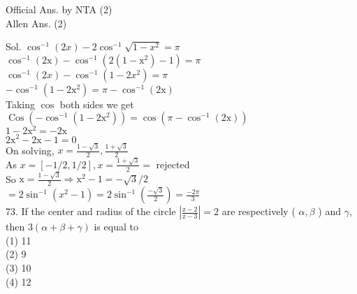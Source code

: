 \documentclass[10pt]{article}
\begin{document}
Official Ans. by NTA (2)\\
Allen Ans. (2)

Sol. \(\cos ^{-1}(2 x)-2 \cos ^{-1} \sqrt{1-x^{2}}=\pi\)\\
\(\cos ^{-1}(2 \mathrm{x})-\cos ^{-1}\left(2\left(1-\mathrm{x}^{2}\right)-1\right)=\pi\)\\
\(\cos ^{-1}(2 x)-\cos ^{-1}\left(1-2 x^{2}\right)=\pi\)\\
\(-\cos ^{-1}\left(1-2 \mathrm{x}^{2}\right)=\pi-\cos ^{-1}(2 \mathrm{x})\)\\
Taking \(\cos\) both sides we get\\
\(\operatorname{Cos}\left(-\cos ^{-1}\left(1-2 \mathrm{x}^{2}\right)\right)=\cos \left(\pi-\cos ^{-1}(2 \mathrm{x})\right)\)\\
\(1-2 \mathrm{x}^{2}=-2 \mathrm{x}\)\\
\(2 \mathrm{x}^{2}-2 \mathrm{x}-1=0\)\\
On solving, \(x=\frac{1-\sqrt{3}}{2}, \frac{1+\sqrt{3}}{2}\)\\
As \(x=[-1 / 2,1 / 2], x=\frac{1+\sqrt{3}}{2}=\) rejected\\
So \(\mathrm{x}=\frac{1-\sqrt{3}}{2} \Rightarrow \mathrm{x}^{2}-1=-\sqrt{3} / 2\)\\
\(=2 \sin ^{-1}\left(x^{2}-1\right)=2 \sin ^{-1}\left(\frac{-\sqrt{3}}{2}\right)=\frac{-2 \pi}{3}\)\\
73. If the center and radius of the circle \(\left|\frac{\mathrm{z}-2}{\mathrm{z}-3}\right|=2\) are respectively ( \(\alpha, \beta\) ) and \(\gamma\), then \(3(\alpha+\beta+\gamma)\) is equal to\\
(1) 11\\
(2) 9\\
(3) 10\\
(4) 12
\end{document}
